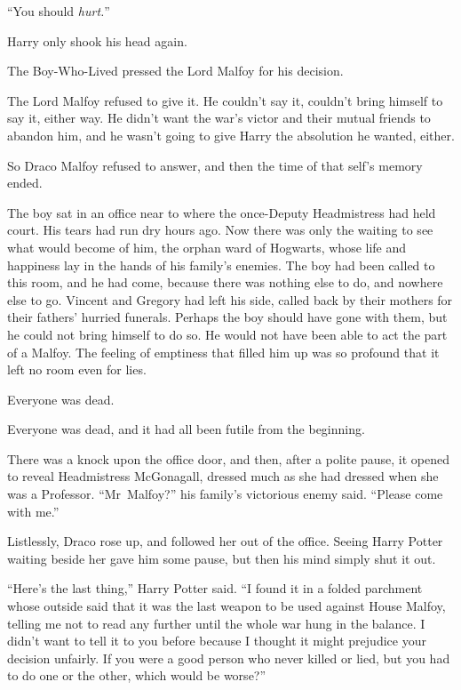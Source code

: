“You should \emph{hurt.}”

Harry only shook his head again.

The Boy-Who-Lived pressed the Lord Malfoy for his decision.

The Lord Malfoy refused to give it. He couldn’t say it, couldn’t bring himself to say it, either way. He didn’t want the war’s victor and their mutual friends to abandon him, and he wasn’t going to give Harry the absolution he wanted, either.

So Draco Malfoy refused to answer, and then the time of that self’s memory ended.

\later

The boy sat in an office near to where the once-Deputy Headmistress had held court. His tears had run dry hours ago. Now there was only the waiting to see what would become of him, the orphan ward of Hogwarts, whose life and happiness lay in the hands of his family’s enemies. The boy had been called to this room, and he had come, because there was nothing else to do, and nowhere else to go. Vincent and Gregory had left his side, called back by their mothers for their fathers’ hurried funerals. Perhaps the boy should have gone with them, but he could not bring himself to do so. He would not have been able to act the part of a Malfoy. The feeling of emptiness that filled him up was so profound that it left no room even for lies.

Everyone was dead.

Everyone was dead, and it had all been futile from the beginning.

There was a knock upon the office door, and then, after a polite pause, it opened to reveal Headmistress McGonagall, dressed much as she had dressed when she was a Professor. “Mr~Malfoy?” his family’s victorious enemy said. “Please come with me.”

Listlessly, Draco rose up, and followed her out of the office. Seeing Harry Potter waiting beside her gave him some pause, but then his mind simply shut it out.

“Here’s the last thing,” Harry Potter said. “I found it in a folded parchment whose outside said that it was the last weapon to be used against House Malfoy, telling me not to read any further until the whole war hung in the balance. I didn’t want to tell it to you before because I thought it might prejudice your decision unfairly. If you were a good person who never killed or lied, but you had to do one or the other, which would be worse?”


